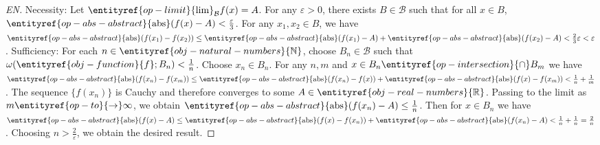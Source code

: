 \begin{proof}[EN]
Necessity: Let $\entityref{op-limit}{\lim}_{\mathcal{B}} f(x) = A$. For any $\varepsilon > 0$, there exists $B \in \mathcal{B}$ such that for all $x \in B$, $\entityref{op-abs-abstract}{\mathrm{abs}}(f(x) - A) < \frac{\varepsilon}{3}$. For any $x_1, x_2 \in B$, we have $\entityref{op-abs-abstract}{\mathrm{abs}}(f(x_1) - f(x_2)) \leq \entityref{op-abs-abstract}{\mathrm{abs}}(f(x_1) - A) + \entityref{op-abs-abstract}{\mathrm{abs}}(f(x_2) - A) < \frac{2}{3}\varepsilon < \varepsilon$.
Sufficiency: For each $n \in \entityref{obj-natural-numbers}{\mathbb{N}}$, choose $B_n \in \mathcal{B}$ such that $\omega(\entityref{obj-function}{f}; B_n) < \frac{1}{n}$. Choose $x_n \in B_n$. For any $n, m$ and $x \in B_n \entityref{op-intersection}{\cap} B_m$ we have $\entityref{op-abs-abstract}{\mathrm{abs}}(f(x_n) - f(x_m)) \leq \entityref{op-abs-abstract}{\mathrm{abs}}(f(x_n) - f(x)) + \entityref{op-abs-abstract}{\mathrm{abs}}(f(x) - f(x_m)) < \frac{1}{n} + \frac{1}{m}$. The sequence $\{f(x_n)\}$ is Cauchy and therefore converges to some $A \in \entityref{obj-real-numbers}{\mathbb{R}}$. Passing to the limit as $m \entityref{op-to}{\to} \infty$, we obtain $\entityref{op-abs-abstract}{\mathrm{abs}}(f(x_n) - A) \leq \frac{1}{n}$. Then for $x \in B_n$ we have $\entityref{op-abs-abstract}{\mathrm{abs}}(f(x) - A) \leq \entityref{op-abs-abstract}{\mathrm{abs}}(f(x) - f(x_n)) + \entityref{op-abs-abstract}{\mathrm{abs}}(f(x_n) - A) < \frac{1}{n} + \frac{1}{n} = \frac{2}{n}$. Choosing $n > \frac{2}{\varepsilon}$, we obtain the desired result.
\end{proof}